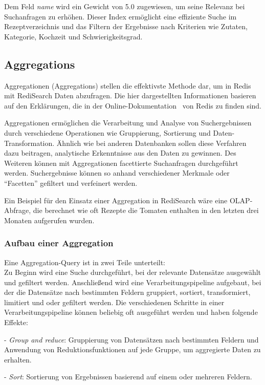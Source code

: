Dem Feld \emph{name} wird ein Gewicht von 5.0 zugewiesen, um seine Relevanz bei Suchanfragen zu erhöhen. Dieser Index ermöglicht eine effiziente Suche im Rezeptverzeichnis und das Filtern der Ergebnisse nach Kriterien wie Zutaten, Kategorie, Kochzeit und Schwierigkeitsgrad.

\subsection{Aggregations}
Aggregationen (Aggregations) stellen die effektivste Methode dar, um in Redis mit RediSearch Daten abzufragen. Die hier dargestellten Informationen basieren auf den Erklärungen, die in der Online-Dokumentation~\cite{redis_ltd_aggregations_nodate} von Redis zu finden sind.

Aggregationen ermöglichen die Verarbeitung und Analyse von Suchergebnissen durch verschiedene Operationen wie Gruppierung, Sortierung und Daten-Transformation. Ähnlich wie bei anderen Datenbanken sollen diese Verfahren dazu beitragen, analytische Erkenntnisse aus den Daten zu gewinnen. Des Weiteren können mit Aggregationen facettierte Suchanfragen durchgeführt werden. Suchergebnisse können so anhand verschiedener Merkmale oder \enquote{Facetten} gefiltert und verfeinert werden.

Ein Beispiel für den Einsatz einer Aggregation in RediSearch wäre eine OLAP-Abfrage, die berechnet wie oft Rezepte die Tomaten enthalten in den letzten drei Monaten aufgerufen wurden.

\subsubsection{Aufbau einer Aggregation}
Eine Aggregation-Query ist in zwei Teile unterteilt:\\
Zu Beginn wird eine Suche durchgeführt, bei der relevante Datensätze ausgewählt und gefiltert werden.
Anschließend wird eine Verarbeitungspipeline aufgebaut, bei der die Datensätze nach bestimmten Feldern gruppiert, sortiert, transformiert, limitiert und oder gefiltert werden. Die verschiedenen Schritte in einer Verarbeitungspipeline können beliebig oft ausgeführt werden und haben folgende Effekte:

- \emph{Group and reduce}: Gruppierung von Datensätzen nach bestimmten Feldern und Anwendung von Reduktionsfunktionen auf jede Gruppe, um aggregierte Daten zu erhalten.
    
- \emph{Sort}: Sortierung von Ergebnissen basierend auf einem oder mehreren Feldern.
    
